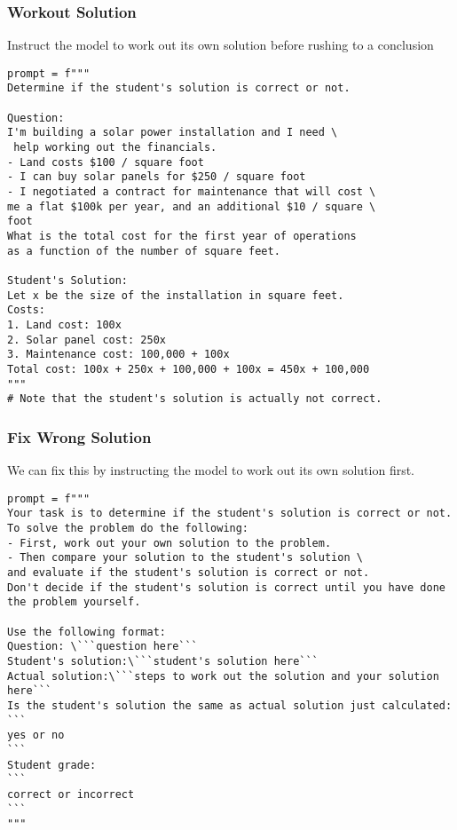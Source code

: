 \begin{frame}[fragile]\frametitle{Workout Solution}

Instruct the model to work out its own solution before rushing to a conclusion

{\tiny
\begin{lstlisting}
prompt = f"""
Determine if the student's solution is correct or not.

Question:
I'm building a solar power installation and I need \
 help working out the financials. 
- Land costs $100 / square foot
- I can buy solar panels for $250 / square foot
- I negotiated a contract for maintenance that will cost \ 
me a flat $100k per year, and an additional $10 / square \
foot
What is the total cost for the first year of operations 
as a function of the number of square feet.

Student's Solution:
Let x be the size of the installation in square feet.
Costs:
1. Land cost: 100x
2. Solar panel cost: 250x
3. Maintenance cost: 100,000 + 100x
Total cost: 100x + 250x + 100,000 + 100x = 450x + 100,000
"""
# Note that the student's solution is actually not correct.
\end{lstlisting}
}

\end{frame}

\begin{frame}[fragile]\frametitle{Fix Wrong Solution}

We can fix this by instructing the model to work out its own solution first.

{\tiny
\begin{lstlisting}
prompt = f"""
Your task is to determine if the student's solution is correct or not.
To solve the problem do the following:
- First, work out your own solution to the problem. 
- Then compare your solution to the student's solution \ 
and evaluate if the student's solution is correct or not. 
Don't decide if the student's solution is correct until you have done the problem yourself.

Use the following format:
Question: \```question here```
Student's solution:\```student's solution here```
Actual solution:\```steps to work out the solution and your solution here```
Is the student's solution the same as actual solution just calculated:
```
yes or no
```
Student grade:
```
correct or incorrect
```
"""
\end{lstlisting}
}
\end{frame}


